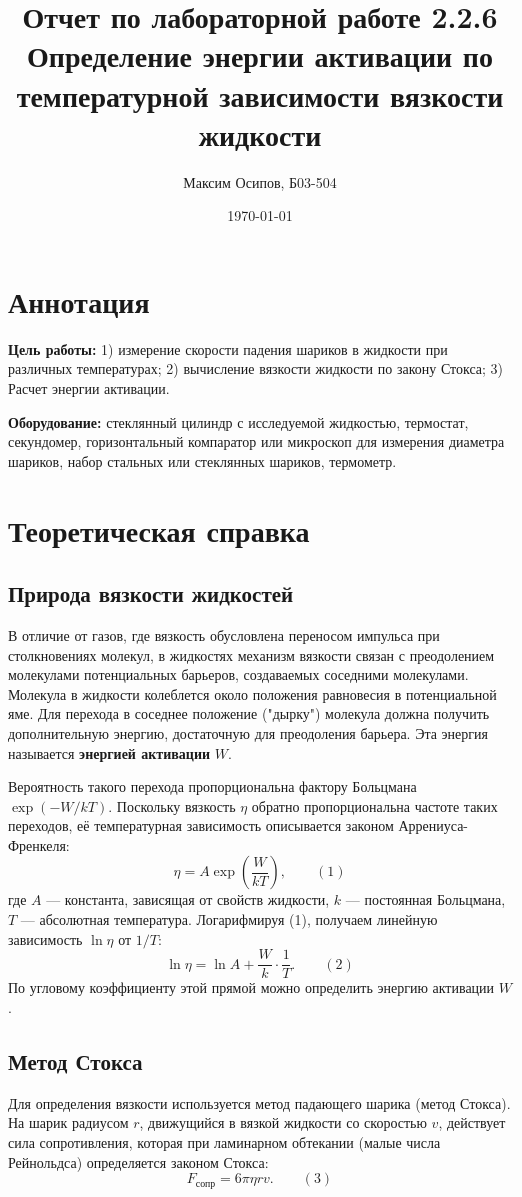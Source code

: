 \documentclass[a4paper, 12pt]{article}
\title{Отчет по лабораторной работе 2.2.6 \\ Определение энергии активации по температурной зависимости вязкости жидкости}
\author{Максим Осипов, Б03-504}
\date{\today}
\begin{document}
\maketitle

\section*{Аннотация}
\textbf{Цель работы:} 1) измерение скорости падения шариков в жидкости при различных температурах; 2) вычисление вязкости жидкости по закону Стокса; 3) Расчет энергии активации.

\textbf{Оборудование:} стеклянный цилиндр с исследуемой жидкостью, термостат, секундомер, горизонтальный компаратор или микроскоп для измерения диаметра шариков, набор стальных или стеклянных шариков, термометр.

\section{Теоретическая справка}

\subsection{Природа вязкости жидкостей}
В отличие от газов, где вязкость обусловлена переносом импульса при столкновениях молекул, в жидкостях механизм вязкости связан с преодолением молекулами потенциальных барьеров, создаваемых соседними молекулами. Молекула в жидкости колеблется около положения равновесия в потенциальной яме. Для перехода в соседнее положение ("дырку") молекула должна получить дополнительную энергию, достаточную для преодоления барьера. Эта энергия называется \textbf{энергией активации} $W$.

Вероятность такого перехода пропорциональна фактору Больцмана $\exp(-W/kT)$. Поскольку вязкость $\eta$ обратно пропорциональна частоте таких переходов, её температурная зависимость описывается законом Аррениуса-Френкеля:
\[
\eta = A \exp\left(\frac{W}{kT}\right), \qquad (1)
\]
где $A$ — константа, зависящая от свойств жидкости, $k$ — постоянная Больцмана, $T$ — абсолютная температура.
Логарифмируя (1), получаем линейную зависимость $\ln \eta$ от $1/T$:
\[
\ln \eta = \ln A + \frac{W}{k} \cdot \frac{1}{T}. \qquad (2)
\]
По угловому коэффициенту этой прямой можно определить энергию активации $W$.

\subsection{Метод Стокса}
Для определения вязкости используется метод падающего шарика (метод Стокса). На шарик радиусом $r$, движущийся в вязкой жидкости со скоростью $v$, действует сила сопротивления, которая при ламинарном обтекании (малые числа Рейнольдса) определяется законом Стокса:
\[
F_{\text{сопр}} = 6\pi \eta r v. \qquad (3)
\]
\end{document}
